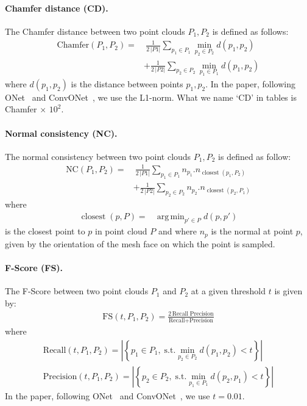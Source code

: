 \documentclass[10pt,twocolumn,letterpaper]{article}
\DeclareMathOperator*{\argmin}{arg\,min}
\DeclareMathOperator*{\closest}{closest}
\begin{document}
\paragraph{Chamfer distance (CD).}

The Chamfer distance between two point clouds $P_1,P_2$ is defined as follows:
\begin{align*}
    \text{Chamfer}(P_1, P_2) =& \> \frac{1}{2\,|P1|} \sum_{p_1 \in P_1} \min_{p_2 \in P_2} d(p_1, p_2) \\ & + \frac{1}{2\,|P2|} \sum_{p_2 \in P_2} \min_{p_1 \in P_1} d(p_1, p_2)
\end{align*}
where $d(p_1, p_2)$ is the distance between points $p_1,p_2$. In the paper, following ONet~\cite{Mescheder2019CVPR} and ConvONet~\cite{Peng2020ECCV}, we use the L1-norm. What we name `CD' in tables is Chamfer$\,\times\,10^2$.

\paragraph{Normal consistency (NC).}

The normal consistency between two point clouds $P_1,P_2$ is defined as follow:
\begin{align*}
    \text{NC}(P_1, P_2) =& \> \frac{1}{2\,|P1|} \sum_{p_1 \in P_1} n_{p_1} . n_{\closest(p_1,P_2)} \\ 
                & + \frac{1}{2\,|P2|} \sum_{p_2 \in P_2} n_{p_2} . n_{\closest(p_2, P_1)}
\end{align*}
where
\begin{align*}
    \closest(p,P) =& \argmin_{p' \in P} d(p, p')
\end{align*}
is the closest point to $p$ in point cloud $P$ and where $n_p$ is the normal at point $p$, given by the orientation of the mesh face on which the point is sampled.

\paragraph{F-Score (FS).}

The F-Score between two point clouds $P_1$ and $P_2$ at a given threshold $t$ is given by:
\begin{align*}
    \text{FS}(t, P_1, P_2) = \frac{2\, \text{Recall} \; \text{Precision} }{\text{Recall}+ \text{Precision}}
\end{align*}
where
\begin{align*}
    \text{Recall}(t, P_1, P_2) = \left| \left\{ p_1 \in P_1, \; \text{s.t.} \min_{p_2 \in P_2} d(p_1, p_2) < t \right\} \right|
    \\
    \text{Precision}(t, P_1, P_2) = \left| \left\{ p_2 \in P_2, \; \text{s.t.} \min_{p_1 \in P_1} d(p_2, p_1) < t \right\} \right|
\end{align*}
In the paper, following ONet~\cite{Mescheder2019CVPR} and ConvONet~\cite{Peng2020ECCV}, we use $t=0.01$.
\end{document}
